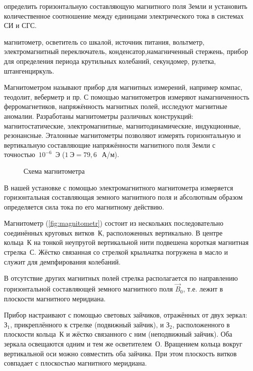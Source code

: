 
\begin{lab:aim}
    определить горизонтальную составляющую магнитного поля Земли и установить количественное соотношение между единицами электрического тока в системах СИ и СГС.
\end{lab:aim}

\begin{lab:equipment}
    магнитометр, осветитель со шкалой, источник питания, вольтметр, электромагнитный переключатель, конденсатор,намагниченный стержень, прибор для определения периода крутильных колебаний, секундомер, рулетка, штангенциркуль.
\end{lab:equipment}


Магнитометром называют прибор для магнитных измерений, например компас, теодолит, веберметр и пр. С помощью
магнитометров измеряют намагниченность ферромагнетиков, напряжённость магнитных полей, исследуют магнитные аномалии.
Разработаны магнитометры различных конструкций: магнитостатические, электромагнитные, магнитодинамические, индукционные,
резонансные. Эталонные магнитометры позволяют измерять горизонтальную и вертикальную составляющие напряжённости
магнитного поля Земли с точностью~$10^{-6}$~Э ($1~Э=79,6~$~А/м).

\begin{wrapfigure}{r}{0.4\textwidth}
	\caption{Схема магнитометра}
	\figmark[magnitometr]
\end{wrapfigure}

В нашей установке с помощью электромагнитного магнитометра измеряется горизонтальная составляющая земного магнитного
поля и абсолютным образом определяется сила тока по его магнитному действию.

\experiment Магнитометр (\ref{fig:magnitometr}) состоит из нескольких последовательно соединённых круговых витков~К, расположенных
вертикально. В центре кольца~К на тонкой неупругой вертикальной нити подвешена короткая магнитная стрелка~С. Жёстко
связанная со стрелкой крыльчатка погружена в масло и служит для демпфирования колебаний.

В отсутствие других магнитных полей стрелка располагается по направлению горизонтальной составляющей земного магнитного
поля $\vec{B}_0$, т.е. лежит в плоскости магнитного меридиана.

Прибор настраивают с помощью световых зайчиков, отражённых от двух зеркал: $З_1$, прикреплённого к стрелке (подвижный
зайчик), и $З_2$, расположенного в плоскости кольца~К и жёстко связанного с ним (неподвижный зайчик). Оба зеркала
освещаются одним и тем же осветителем~О. Вращением кольца вокруг вертикальной оси можно совместить оба зайчика. При этом
плоскость витков совпадает с плоскостью магнитного меридиана.

